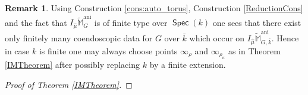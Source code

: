 \documentclass{article}
\DeclareMathOperator{\A}{\mathsf{A}}
\DeclareMathOperator{\ani}{ani}
\DeclareMathOperator{\Spec}{\mathsf{Spec}}
\newcommand{\BM}{{\mathbb{M}}}
\newcommand{\BT}{{\mathbb{T}}}
\theoremstyle{definition}
\newtheorem{rmk}[definition]{Remark}
\theoremstyle{plain}
\begin{document}
\begin{rmk} \label{SplitingRmk}
  Using Construction \ref{cons:auto_torus}, Construction \ref{ReductionCons} and the fact that $I_{\hat\mu}\widetilde{\BM}^{\ani}_G$ is of finite type over $\Spec(k)$ one sees that there exist only finitely many coendoscopic data for $G$ over $\bar k$ which occur on $I_{\hat\mu}\widetilde\BM^{\ani}_{G,\bar k}$. Hence in case $k$ is finite one may always choose points $\infty_\rho$ and $\infty_{\rho_\kappa}$ as in Theorem \ref{IMTheorem} after possibly replacing $k$ by a finite extension.
\end{rmk}
\begin{proof}[Proof of Theorem \ref{IMTheorem}]




\end{proof}
\end{document}
